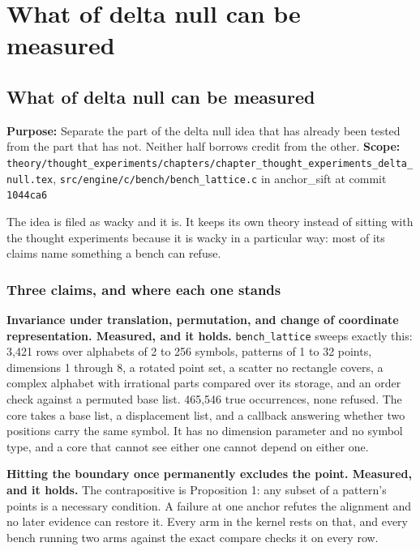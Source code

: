 \chapter{What of delta null can be measured}

\section{What of delta null can be measured}

\textbf{Purpose:} Separate the part of the delta null idea that has already been tested from the part that has not. Neither half borrows credit from the other. \textbf{Scope:} \texttt{theory/\allowbreak{}thought\_\allowbreak{}experiments/\allowbreak{}chapters/\allowbreak{}chapter\_\allowbreak{}thought\_\allowbreak{}experiments\_\allowbreak{}delta\_\allowbreak{}null.\allowbreak{}tex}, \texttt{src/\allowbreak{}engine/\allowbreak{}c/\allowbreak{}bench/\allowbreak{}bench\_\allowbreak{}lattice.\allowbreak{}c} in anchor\_sift at commit \texttt{1044ca6}

The idea is filed as wacky and it is. It keeps its own theory instead of sitting with the thought experiments because it is wacky in a particular way: most of its claims name something a bench can refuse.

\subsection{Three claims, and where each one stands}

\textbf{Invariance under translation, permutation, and change of coordinate representation. Measured, and it holds.} \texttt{bench\_\allowbreak{}lattice} sweeps exactly this: 3,421 rows over alphabets of 2 to 256 symbols, patterns of 1 to 32 points, dimensions 1 through 8, a rotated point set, a scatter no rectangle covers, a complex alphabet with irrational parts compared over its storage, and an order check against a permuted base list. 465,546 true occurrences, none refused. The core takes a base list, a displacement list, and a callback answering whether two positions carry the same symbol. It has no dimension parameter and no symbol type, and a core that cannot see either one cannot depend on either one.

\textbf{Hitting the boundary once permanently excludes the point. Measured, and it holds.} The contrapositive is Proposition 1: any subset of a pattern's points is a necessary condition. A failure at one anchor refutes the alignment and no later evidence can restore it. Every arm in the kernel rests on that, and every bench running two arms against the exact compare checks it on every row.

